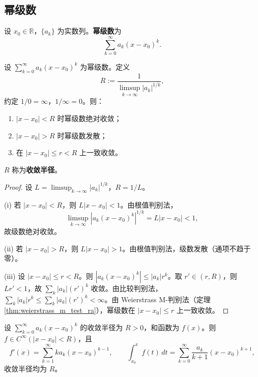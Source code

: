\subsection{幂级数}

\begin{definition}[幂级数]\label{def:power_series_ra}
设 $x_0 \in \mathbb{R}$，$\{a_k\}$ 为实数列。\textbf{幂级数}为
\[
\sum_{k=0}^{\infty} a_k (x - x_0)^k.
\]
\end{definition}

\begin{theorem}\label{thm:cauchy_hadamard_ra}
设 $\sum_{k=0}^{\infty} a_k (x - x_0)^k$ 为幂级数。定义
\[
R := \frac{1}{\limsup_{k \to \infty} |a_k|^{1/k}},
\]
约定 $1/0 = \infty$，$1/\infty = 0$。则：
\begin{enumerate}[label=(\roman*)]
    \item $|x - x_0| < R$ 时幂级数绝对收敛；
    \item $|x - x_0| > R$ 时幂级数发散；
    \item 在 $|x - x_0| \le r < R$ 上一致收敛。
\end{enumerate}
$R$ 称为\textbf{收敛半径}。
\end{theorem}

\begin{proof}
设 $L = \limsup_{k \to \infty} |a_k|^{1/k}$，$R = 1/L$。

(i) 若 $|x - x_0| < R$，则 $L |x - x_0| < 1$。由根值判别法，
\[
\limsup_{k \to \infty} |a_k (x - x_0)^k|^{1/k} = L |x - x_0| < 1,
\]
故级数绝对收敛。

(ii) 若 $|x - x_0| > R$，则 $L |x - x_0| > 1$。由根值判别法，级数发散（通项不趋于零）。

(iii) 设 $|x - x_0| \le r < R$。则 $|a_k (x - x_0)^k| \le |a_k| r^k$。取 $r' \in (r, R)$，则 $L r' < 1$，故 $\sum_k |a_k| (r')^k$ 收敛。由比较判别法，$\sum_k |a_k| r^k \le \sum_k |a_k| (r')^k < \infty$。由 Weierstrass M-判别法（定理 \ref{thm:weierstrass_m_test_ra}），幂级数在 $|x - x_0| \le r$ 上一致收敛。
\end{proof}

\begin{theorem}[幂级数的逐项求导与逐项积分]\label{thm:power_series_termwise}
设 $\sum_{k=0}^{\infty} a_k (x - x_0)^k$ 的收敛半径为 $R > 0$，和函数为 $f(x)$。则 $f \in C^\infty(|x - x_0| < R)$，且
\[
f'(x) = \sum_{k=1}^{\infty} k a_k (x - x_0)^{k-1}, \qquad
\int_{x_0}^{x} f(t) \, dt = \sum_{k=0}^{\infty} \frac{a_k}{k+1} (x - x_0)^{k+1},
\]
收敛半径均为 $R$。
\end{theorem}

